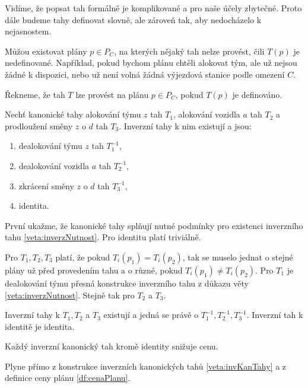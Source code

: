 Vidíme, že popsat tah formálně je komplikované a pro naše účely zbytečné.
Proto dále budeme tahy definovat slovně, ale zároveň tak, aby nedocházelo k nejasnostem.

Můžou existovat plány $p \in P_C$, na kterých nějaký tah nelze provést, čili $T(p)$ je nedefinované.
Například, pokud bychom plánu chtěli alokovat tým, ale už nejsou žádné k dispozici, nebo už není volná žádná výjezdová stanice podle omezení $C$.

\begin{definice}
  Řekneme, že tah $T$ lze provést na plánu $p \in P_C$, pokud $T(p)$ je definováno.
\end{definice}

\begin{veta}\label{veta:invKanTahy}
  Nechť kanonické tahy alokování týmu $z$ tah $T_1$, alokování vozidla $a$ tah $T_2$ a prodloužení směny $z$ o $d$ tah $T_3$.
  Inverzní tahy k nim existují a jsou:

  \begin{enumerate}
    \item
      dealokování týmu $z$ tah $T_1^{-1}$,

    \item
      dealokování vozidla $a$ tah $T_2^{-1}$,

    \item
      zkrácení směny $z$ o $d$ tah $T_3^{-1}$,

    \item
      identita.
  \end{enumerate}
\end{veta}
\begin{dukaz}
  První ukažme, že kanonické tahy splňují nutné podmínky pro existenci inverzního tahu \ref{veta:inverzNutnost}.
  Pro identitu platí triviálně.

  Pro $T_1, T_2, T_3$ platí, že pokud $T_i(p_1) = T_i(p_2)$, tak se muselo jednat o stejné plány už před provedením tahu a o různé, pokud $T_i(p_1) \neq T_i(p_2)$.
  Pro $T_1$ je dealokování týmu přesná konstrukce inverzního tahu z důkazu věty \ref{veta:inverzNutnost}.
  Stejně tak pro $T_2$ a $T_3$.

  Inverzní tahy k $T_1, T_2$ a $T_3$ existují a jedná se právě o $T_1^{-1}, T_2^{-1}, T_3^{-1}$.
  Inverzní tah k identitě je identita.
\end{dukaz}

\begin{veta}\label{veta:kazdyInvSnizujeCenu}
  Každý inverzní kanonický tah kromě identity snižuje cenu.
\end{veta}
\begin{dukaz}
  Plyne přímo z konstrukce inverzních kanonických tahů \ref{veta:invKanTahy} a z definice ceny plánu \ref{df:cenaPlanu}.
\end{dukaz}

